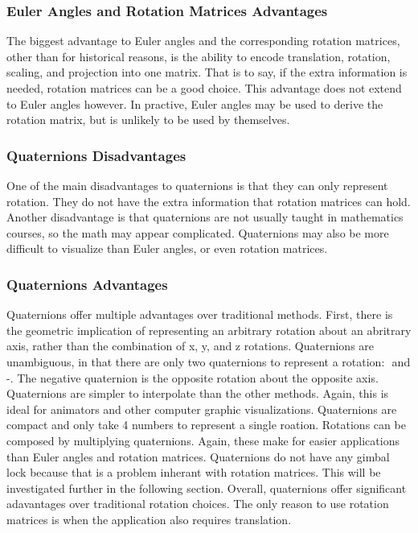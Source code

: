 \subsubsection{Euler Angles and Rotation Matrices Advantages}
The biggest advantage to Euler angles and the corresponding rotation matrices, other than for historical reasons, is the ability to encode translation, rotation, scaling, and projection into one matrix.
That is to say, if the extra information is needed, rotation matrices can be a good choice.
This advantage does not extend to Euler angles however.
In practive, Euler angles may be used to derive the rotation matrix, but is unlikely to be used by themselves.
\subsubsection{Quaternions Disadvantages}
One of the main disadvantages to quaternions is that they can only represent rotation.
They do not have the extra information that rotation matrices can hold.
Another disadvantage is that quaternions are not usually taught in mathematics courses, so the math may appear complicated.
Quaternions may also be more difficult to visualize than Euler angles, or even rotation matrices.
\subsubsection{Quaternions Advantages}
Quaternions offer multiple advantages over traditional methods.
First, there is the geometric implication of representing an arbitrary rotation about an abritrary axis, rather than the combination of x, y, and z rotations.
Quaternions are unambiguous, in that there are only two quaternions to represent a rotation: \qq$ $ and -\qq$ $.
The negative quaternion is the opposite rotation about the opposite axis.
Quaternions are simpler to interpolate than the other methods.
Again, this is ideal for animators and other computer graphic visualizations.
Quaternions are compact and only take 4 numbers to represent a single roation.
Rotations can be composed by multiplying quaternions.
Again, these make for easier applications than Euler angles and rotation matrices.
Quaternions do not have any gimbal lock because that is a problem inherant with rotation matrices.
This will be investigated further in the following section.
Overall, quaternions offer significant adavantages over traditional rotation choices.
The only reason to use rotation matrices is when the application also requires translation.
